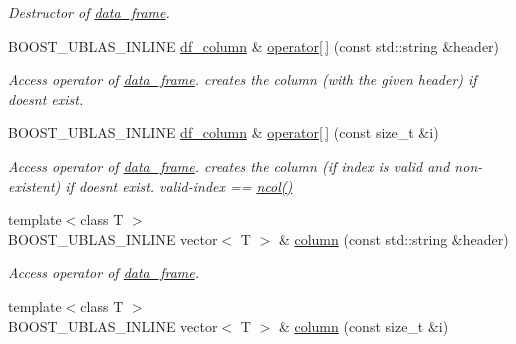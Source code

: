 \begin{DoxyCompactItemize}
\begin{DoxyCompactList}\small\item\em Destructor of \hyperlink{classboost_1_1numeric_1_1ublas_1_1data__frame}{data\+\_\+frame}. \end{DoxyCompactList}\item 
B\+O\+O\+S\+T\+\_\+\+U\+B\+L\+A\+S\+\_\+\+I\+N\+L\+I\+NE \hyperlink{classboost_1_1numeric_1_1ublas_1_1df__column}{df\+\_\+column} \& \hyperlink{classboost_1_1numeric_1_1ublas_1_1data__frame_a7bc6a73935b5d7f0dbdfffdcdae841dd}{operator\mbox{[}$\,$\mbox{]}} (const std\+::string \&header)
\begin{DoxyCompactList}\small\item\em Access operator of \hyperlink{classboost_1_1numeric_1_1ublas_1_1data__frame}{data\+\_\+frame}. creates the column (with the given header) if doesn\textquotesingle{}t exist. \end{DoxyCompactList}\item 
B\+O\+O\+S\+T\+\_\+\+U\+B\+L\+A\+S\+\_\+\+I\+N\+L\+I\+NE \hyperlink{classboost_1_1numeric_1_1ublas_1_1df__column}{df\+\_\+column} \& \hyperlink{classboost_1_1numeric_1_1ublas_1_1data__frame_a58496ee7ebcb0c67457b2c0c476ecec4}{operator\mbox{[}$\,$\mbox{]}} (const size\+\_\+t \&i)
\begin{DoxyCompactList}\small\item\em Access operator of \hyperlink{classboost_1_1numeric_1_1ublas_1_1data__frame}{data\+\_\+frame}. creates the column (if index is valid and non-\/existent) if doesn\textquotesingle{}t exist. valid-\/index == {\ttfamily \hyperlink{classboost_1_1numeric_1_1ublas_1_1data__frame_adf7817e6cf0dcc7fa6d892a351b5c9a8}{ncol()}} \end{DoxyCompactList}\item 
{\footnotesize template$<$class T $>$ }\\B\+O\+O\+S\+T\+\_\+\+U\+B\+L\+A\+S\+\_\+\+I\+N\+L\+I\+NE vector$<$ T $>$ \& \hyperlink{classboost_1_1numeric_1_1ublas_1_1data__frame_a261a6b02e41c2d5c3e17c7a91c5cb2d5}{column} (const std\+::string \&header)
\begin{DoxyCompactList}\small\item\em Access operator of \hyperlink{classboost_1_1numeric_1_1ublas_1_1data__frame}{data\+\_\+frame}. \end{DoxyCompactList}\item 
{\footnotesize template$<$class T $>$ }\\B\+O\+O\+S\+T\+\_\+\+U\+B\+L\+A\+S\+\_\+\+I\+N\+L\+I\+NE vector$<$ T $>$ \& \hyperlink{classboost_1_1numeric_1_1ublas_1_1data__frame_ac7a4a31485c55e9b3254e1e62ea4c7a8}{column} (const size\+\_\+t \&i)

\end{DoxyCompactItemize}

